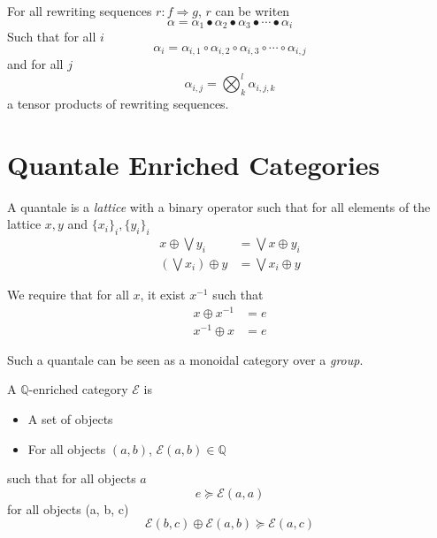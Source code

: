 \documentclass[a4paper]{article}
\begin{document}
\begin{corollary}
  For all rewriting sequences $r: f \Rightarrow g$, $r$ can be writen
  \[
    \alpha = \alpha_1 \bullet \alpha_2 \bullet \alpha_3 \bullet \cdots \bullet
      \alpha_i
  \]
  Such that for all $i$
  \[
    \alpha_i = \alpha_{i, 1} \circ \alpha_{i, 2} \circ \alpha_{i, 3} \circ
      \cdots \circ \alpha_{i, j}
  \]
  and for all $j$
  \[
    \alpha_{i, j} = \bigotimes_k^l \alpha_{i, j, k}
  \]
  a tensor products of rewriting sequences.
\end{corollary}

\section{Quantale Enriched Categories}
\label{sec:quant-enrich-categ}


\begin{definition}
  A quantale is a \emph{lattice} with a binary operator such that for all
    elements of the lattice $x, y$ and $\{x_i\}_i, \{y_i\}_i$
  \begin{align}
    x \oplus \bigvee y_i &= \bigvee x \oplus y_i \\
    \left(\bigvee x_i\right) \oplus y &= \bigvee x_i \oplus y
  \end{align}
  
  We require that for all $x$, it exist $x^{-1}$ such that
  \begin{align}
    x \oplus x^{-1} &= e \\
    x^{-1} \oplus x &= e
  \end{align}
  
  Such a quantale can be seen as a monoidal category over a \emph{group}.
\end{definition}

\begin{definition}
  A $\mathbb{Q}$-enriched category $\mathcal{E}$ is
  
  \begin{itemize}
    \item A set of objects
    \item For all objects $(a, b)$, $\mathcal{E}(a, b) \in \mathbb{Q}$
  \end{itemize}
  
  such that for all objects $a$
  \[
    e \succeq \mathcal{E}(a, a)
  \]
  for all objects (a, b, c)
  \[
    \mathcal{E}(b, c) \oplus \mathcal{E}(a, b) \succeq \mathcal{E}(a, c)
  \]
\end{definition}
\end{document}
